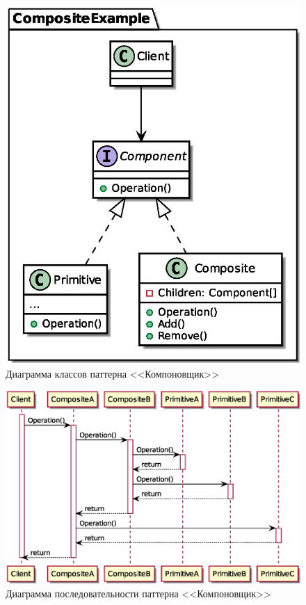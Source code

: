 \documentclass[PI,LAB]{HSEUniversity}
\begin{document}
\begin{figure}[p]
  \centering
  \includegraphics[scale=0.7]{Composite_CD.eps}
  \caption{Диаграмма классов паттерна <<Компоновщик>>}
\end{figure}

\begin{figure}[p]
  \centering
  \includegraphics[scale=0.75]{Composite_SD.eps}
  \caption{Диаграмма последовательности паттерна <<Компоновщик>>}
\end{figure}
\clearpage
\end{document}
